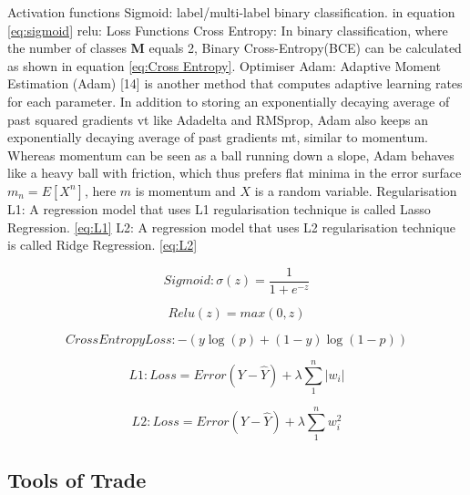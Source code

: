 \begin{outline}
 \1 Activation functions 
   \2 Sigmoid: label/multi-label binary classification. in equation \ref{eq:sigmoid}
   \2 relu: 
 \1 Loss Functions
    \2 Cross Entropy: In binary classification, where the number of classes \textbf{M} equals 2, Binary Cross-Entropy(BCE) can be calculated as shown in equation \ref{eq:Cross Entropy}. 
 \1 Optimiser
    \2 Adam: Adaptive Moment Estimation (Adam) [14] is another method that computes adaptive learning rates for each parameter. In addition to storing an exponentially decaying average of past squared gradients vt like Adadelta and RMSprop, Adam also keeps an exponentially decaying average of past gradients mt, similar to momentum. Whereas momentum can be seen as a ball running down a slope, Adam behaves like a heavy ball with friction, which thus prefers flat minima in the error surface $m_n = E[X^n]$, here $m$ is momentum and $X$ is a random variable. 
 \1 Regularisation
    \2 L1: A regression model that uses L1 regularisation technique is called Lasso Regression. \ref{eq:L1}
    \2 L2: A regression model that uses L2 regularisation technique is called Ridge Regression. \ref{eq:L2}

\end{outline}


\begin{equation} \label{eq:sigmoid}
    Sigmoid: \sigma(z) = \frac{1} {1 + e^{-z}}
\end{equation}

\begin{equation} \label{eq:Relu}
    Relu(z) = max(0, z)
\end{equation}


\begin{equation} \label{eq:Cross Entropy}
   Cross Entropy Loss: -{(y\log(p) + (1 - y)\log(1 - p))}
\end{equation}

\begin{equation} \label{eq:L1}
    L1: Loss = Error(Y - \widehat{Y}) + \lambda \sum_1^n |w_i|
\end{equation}

\begin{equation} \label{eq:L2}
    L2: Loss = Error(Y - \widehat{Y}) +  \lambda \sum_1^n w_i^{2}
\end{equation}

\subsection{Tools of Trade}\label{subsec:tools-of-trade}

